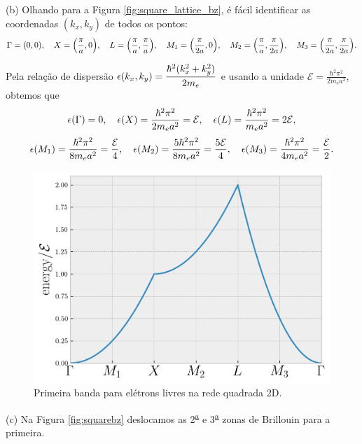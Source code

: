 \documentclass[a4paper,10pt]{article}
\begin{document}
\n

(b) Olhando para a Figura \ref{fig:square_lattice_bz}, é fácil identificar as coordenadas $(k_x, k_y)$ de todos os pontos:
$$
\Gamma = \qty(0, 0), \quad
X = \qty(\frac{\pi}{a}, 0), \quad
L = \qty(\frac{\pi}{a}, \frac{\pi}{a}), \quad
M_1 = \qty(\frac{\pi}{2a}, 0), \quad
M_2 = \qty(\frac{\pi}{a}, \frac{\pi}{2a}), \quad
M_3 = \qty(\frac{\pi}{2a}, \frac{\pi}{2a}).
$$

Pela relação de dispersão $\displaystyle{\epsilon(k_x, k_y) = \frac{\hbar^2 (k_x^2 + k_y^2)}{2m_e}}$ e usando a unidade $\displaystyle{\mathcal{E} = \frac{\hbar^2 \pi^2}{2 m_e a^2}}$, obtemos que
$$
\epsilon(\Gamma) = 0, \quad
\epsilon(X) = \frac{\hbar^2 \pi^2}{2 m_e a^2} = \mathcal{E}, \quad
\epsilon(L) = \frac{\hbar^2 \pi^2}{m_e a^2} = 2 \mathcal{E},
$$
$$
\epsilon(M_1) = \frac{\hbar^2 \pi^2}{8 m_e a^2} = \frac{\mathcal{E}}{4}, \quad
\epsilon(M_2) = \frac{5\hbar^2 \pi^2}{8 m_e a^2} = \frac{5\mathcal{E}}{4}, \quad
\epsilon(M_3) = \frac{\hbar^2 \pi^2}{4 m_e a^2} = \frac{\mathcal{E}}{2}.
$$

\begin{figure}[H]
\centering
\includegraphics[width=0.5\linewidth]{fig/band_struct_square_free.png}
\caption{Primeira banda para elétrons livres na rede quadrada 2D.}
\label{fig:band_struct_square_free}
\end{figure}

(c) Na Figura \ref{fig:squarebz} deslocamos as 2\textsuperscript{\underline{a}} e 3\textsuperscript{\underline{a}} zonas de Brillouin para a primeira.
\end{document}
